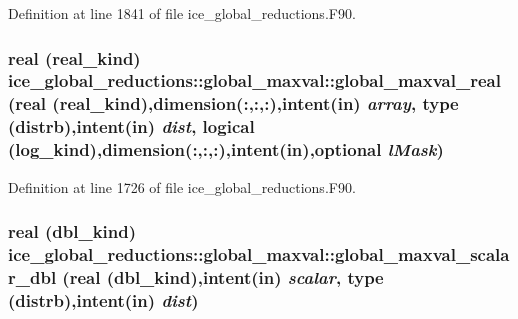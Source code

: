 Definition at line 1841 of file ice\_\-global\_\-reductions.F90.\hypertarget{interfaceice__global__reductions_1_1global__maxval_ae05c6bf55e813e8628ab93fc277da7fd}{
\subsubsection[{global\_\-maxval\_\-real}]{\setlength{\rightskip}{0pt plus 5cm}real (real\_\-kind) ice\_\-global\_\-reductions::global\_\-maxval::global\_\-maxval\_\-real (real (real\_\-kind),dimension(:,:,:),intent(in) {\em array}, \/  type ({\bf distrb}),intent(in) {\em dist}, \/  logical (log\_\-kind),dimension(:,:,:),intent(in),optional {\em lMask})}}
\label{interfaceice__global__reductions_1_1global__maxval_ae05c6bf55e813e8628ab93fc277da7fd}


Definition at line 1726 of file ice\_\-global\_\-reductions.F90.\hypertarget{interfaceice__global__reductions_1_1global__maxval_a6db43b036b9497a6c00d987cd1677207}{
\subsubsection[{global\_\-maxval\_\-scalar\_\-dbl}]{\setlength{\rightskip}{0pt plus 5cm}real (dbl\_\-kind) ice\_\-global\_\-reductions::global\_\-maxval::global\_\-maxval\_\-scalar\_\-dbl (real (dbl\_\-kind),intent(in) {\em scalar}, \/  type ({\bf distrb}),intent(in) {\em dist})}}
\label{interfaceice__global__reductions_1_1global__maxval_a6db43b036b9497a6c00d987cd1677207}


